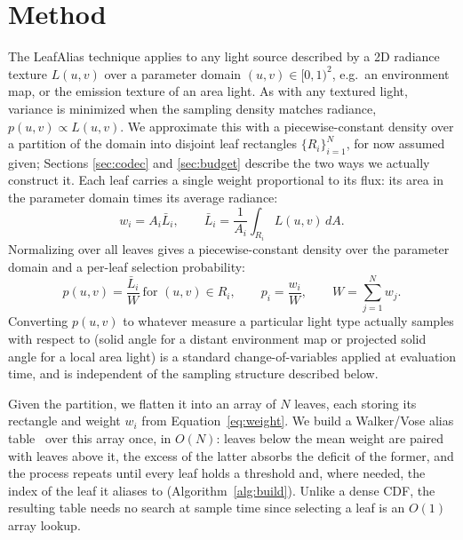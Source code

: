 \documentclass[acmtog,review]{acmart}
\begin{document}
\section{Method}\label{sec:method}

The LeafAlias technique applies to any light source described by a 2D radiance texture $L(u,v)$ over
a parameter domain $(u,v)\in[0,1)^2$, e.g.\ an environment map, or the emission texture of an
area light. As with any textured light, variance is minimized when the sampling density
matches radiance, $p(u,v)\propto L(u,v)$. We approximate this with a piecewise-constant density
over a partition of the domain into disjoint leaf rectangles $\{R_i\}_{i=1}^N$, for now
assumed given; Sections \ref{sec:codec} and \ref{sec:budget} describe the two ways we
actually construct it. Each leaf carries a single weight proportional to its flux: its area in the parameter domain
times its average radiance:
\begin{equation}
w_i = A_i \bar{L}_i, \qquad \bar{L}_i = \frac{1}{A_i}\int_{R_i} L(u,v)\,dA. \label{eq:weight}
\end{equation}
Normalizing over all leaves gives a piecewise-constant density over the parameter domain
and a per-leaf selection probability:
\begin{equation}
p(u,v) = \frac{\bar{L}_i}{W} \ \text{for } (u,v) \in R_i, \qquad
p_i = \frac{w_i}{W}, \qquad W = \sum_{j=1}^N w_j. \label{eq:pdf}
\end{equation}
Converting $p(u,v)$ to whatever measure a particular light type actually samples with
respect to (solid angle for a distant environment map or projected solid angle for a local
area light) is a standard change-of-variables applied at evaluation time, and is
independent of the sampling structure described below.

Given the partition, we flatten it into an array of $N$ leaves, each storing its rectangle
and weight $w_i$ from Equation~\ref{eq:weight}. We build a Walker/Vose alias
table~\cite{vose1991linear} over this array once, in $O(N)$: leaves below the mean weight
are paired with leaves above it, the excess of the latter absorbs the deficit of the
former, and the process repeats until every leaf holds a threshold and, where needed, the
index of the leaf it aliases to (Algorithm~\ref{alg:build}). Unlike a dense CDF, the
resulting table needs no search at sample time since selecting a leaf is an $O(1)$ array
lookup.
\end{document}
